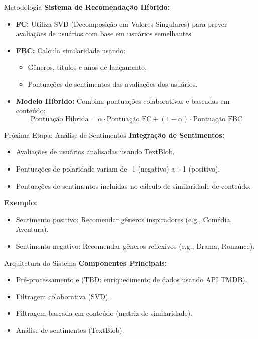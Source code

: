 \documentclass{beamer}
\begin{document}
\begin{frame}{Metodologia}
    \textbf{Sistema de Recomendação Híbrido:}
    \begin{itemize}
        \item \textbf{FC:} Utiliza SVD (Decomposição em Valores Singulares) para prever avaliações de usuários com base em usuários semelhantes.
        \item \textbf{FBC:} Calcula similaridade usando:
        \begin{itemize}
            \item Gêneros, títulos e anos de lançamento.
            \item Pontuações de sentimentos das avaliações dos usuários.
        \end{itemize}
        \item \textbf{Modelo Híbrido:} Combina pontuações colaborativas e baseadas em conteúdo:
        \[
        \text{Pontuação Híbrida} = \alpha \cdot \text{Pontuação FC} + (1 - \alpha) \cdot \text{Pontuação FBC}
        \]
    \end{itemize}
\end{frame}

\begin{frame}{Próxima Etapa: Análise de Sentimentos}
    \textbf{Integração de Sentimentos:}
    \begin{itemize}
        \item Avaliações de usuários analisadas usando TextBlob.
        \item Pontuações de polaridade variam de -1 (negativo) a +1 (positivo).
        \item Pontuações de sentimentos incluídas no cálculo de similaridade de conteúdo.
    \end{itemize}
    \vspace{0.5cm}
    \textbf{Exemplo:}
    \begin{itemize}
        \item Sentimento positivo: Recomendar gêneros inspiradores (e.g., Comédia, Aventura).
        \item Sentimento negativo: Recomendar gêneros reflexivos (e.g., Drama, Romance).
    \end{itemize}
\end{frame}

\begin{frame}{Arquitetura do Sistema}
    \textbf{Componentes Principais:}
    \begin{itemize}
        \item Pré-processamento e (TBD: enriquecimento de dados usando API TMDB).
        \item Filtragem colaborativa (SVD).
        \item Filtragem baseada em conteúdo (matriz de similaridade).
        \item Análise de sentimentos (TextBlob).
    \end{itemize}
\end{frame}
\end{document}
